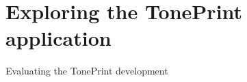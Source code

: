 \chapter{Exploring the TonePrint application}
\label{HeursiticEvaluation}
\begin{LARGE}
Evaluating the TonePrint development
\end{LARGE}



